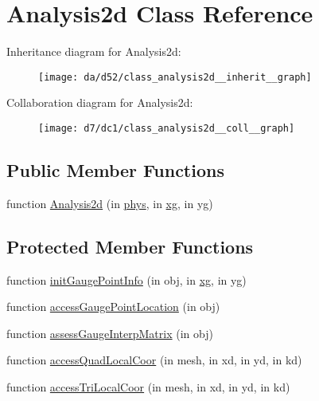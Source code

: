 \hypertarget{class_analysis2d}{}\section{Analysis2d Class Reference}
\label{class_analysis2d}


Inheritance diagram for Analysis2d\+:
\nopagebreak
\begin{figure}[H]
\begin{center}
\leavevmode
\texttt{[image: da/d52/class\_analysis2d\_\_inherit\_\_graph]}
\end{center}
\end{figure}


Collaboration diagram for Analysis2d\+:
\nopagebreak
\begin{figure}[H]
\begin{center}
\leavevmode
\texttt{[image: d7/dc1/class\_analysis2d\_\_coll\_\_graph]}
\end{center}
\end{figure}
\subsection*{Public Member Functions}
\begin{DoxyCompactItemize}
\item 
function \hyperlink{class_analysis2d_ad39a249e19eddf6e9547e6467eb60d26}{Analysis2d} (in \hyperlink{class_abstract_analysis_aa0d0d19a77f93d3ad8d25f4812d0b42f}{phys}, in \hyperlink{class_abstract_analysis_abaf0926252e93facb0590298a27f0ae6}{xg}, in yg)
\end{DoxyCompactItemize}
\subsection*{Protected Member Functions}
\begin{DoxyCompactItemize}
\item 
function \hyperlink{class_analysis2d_a97a2f6afea95ed3750bf0b602ae200b5}{init\+Gauge\+Point\+Info} (in obj, in \hyperlink{class_abstract_analysis_abaf0926252e93facb0590298a27f0ae6}{xg}, in yg)
\item 
function \hyperlink{class_analysis2d_ad58c2097db31a0eb0ae6b4f4624383ef}{access\+Gauge\+Point\+Location} (in obj)
\item 
function \hyperlink{class_analysis2d_a6c0bcc80a3922d5e9209b2bcd15734f9}{assess\+Gauge\+Interp\+Matrix} (in obj)
\item 
function \hyperlink{class_analysis2d_ae055d553dede0118a9e39d395357e42c}{access\+Quad\+Local\+Coor} (in mesh, in xd, in yd, in kd)
\item 
function \hyperlink{class_analysis2d_a6452fd530a2649f7e54398834d94535d}{access\+Tri\+Local\+Coor} (in mesh, in xd, in yd, in kd)
\end{DoxyCompactItemize}
